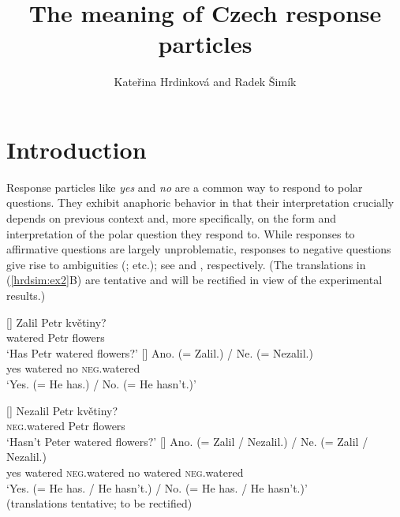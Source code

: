 \documentclass[output=paper,colorlinks,citecolor=brown]{langscibook}
\author{Kateřina Hrdinková\affiliation{Charles University} and Radek Šimík\orcid{0000-0002-4736-195X}\affiliation{Charles University}}
\title{The meaning of Czech response particles}
\begin{document}
% 

\maketitle

% 

\section{Introduction} \label{hrdsim:sec:introduction}

Response particles like \textit{yes} and \textit{no} are a common way to respond to polar questions. They exhibit anaphoric behavior in that their interpretation crucially depends on previous context and, more specifically, on the form and interpretation of the polar question they respond to. While responses to affirmative questions are largely unproblematic, responses to negative questions give rise to ambiguities (\citealt{Kramer.Rawlins2011,espinal2019response,roelofsen-farkas15,hrd+:krifka13}; etc.); see  and , respectively. (The translations in (\ref{hrdsim:ex2}B) are tentative and will be rectified in view of the experimental results.)

\begin{exe}
\ex
\begin{xlist}
[]{ 
\gll Zalil Petr květiny?\\  
    watered Petr flowers\\  
    \glt ‘Has Petr watered flowers?'}
[]{
\gll Ano. (= Zalil.) / Ne. (= Nezalil.)\\
yes {} watered {} no {} \textsc{neg}.watered\\
\glt ‘Yes. (= He has.) / No. (= He hasn't.)'
}\label{hrdsim:ex1}
\end{xlist}
\end{exe}

\begin{exe}
\ex  
\begin{xlist}
[]{ 
\gll    Nezalil Petr květiny?\\
        \textsc{neg}.watered Petr flowers\\
        \glt ‘Hasn't Peter watered flowers?'}
[]{
\gll Ano. (= Zalil / Nezalil.) / Ne. (= Zalil / Nezalil.)\\
yes {} watered {} \textsc{neg}.watered {} no {} watered {} \textsc{neg}.watered\\
\glt   ‘Yes. (= He has. / He hasn't.) / No. (= He has. / He hasn't.)'\\\hfill (translations tentative; to be rectified)
}\label{hrdsim:ex2}
\end{xlist}
\end{exe}
\end{document}
